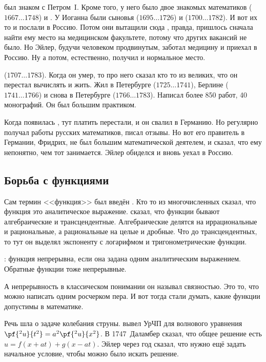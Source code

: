\documentclass[a4paper,oneside,fleqn,10pt]{article}
\newcommand{\pe}[2]{${#1}\ldots{#2}$}
\begin{document}
 был знаком с Петром~I. Кроме того, у него было двое знакомых математиков
 (\pe{1667}{1748}) и .
У Иоганна были сыновья  (\pe{1695}{1726}) и 
(\pe{1700}{1782}). И вот их то и послали в Россию.
Потом они вытащили сюда , правда, пришлось сначала найти ему место на медицинском факультете,
потому что других вакансий не было. Но Эйлер, будучи человеком продвинутым, заботал медицину
и приехал в Россию. Ну а потом, естественно, получил и нормальное место.

 (\pe{1707}{1783}). Когда он умер, то про него сказал кто то из великих, что он перестал вычислять и жить.
Жил в Петербурге (\pe{1725}{1741}), Берлине (\pe{1741}{1766}) и снова в Петербурге (\pe{1766}{1783}).
Написал более 850 работ, 40 монографий. Он был большим практиком.

Когда появилась , тут платить перестали, и он свалил в Германию.
Но регулярно получал работы русских математиков, писал отзывы. Но вот его правитель в Германии, Фридрих,
не был большим математической деятелем, и сказал, что ему непонятно, чем тот занимается.
Эйлер обиделся и вновь уехал в Россию.

\subsection{Борьба с функциями}

Сам термин <<функция>> был введён . Кто то из многочисленных
 сказал, что функция это аналитическое выражение.
 сказал, что функции бывают алгебраические и трансцендентные.
Алгебраические делятся на иррациональные и рациональные, а рациональные на целые и дробные.
Что до трансцендентных, то тут он выделял экспоненту с логарифмом и тригонометрические функции.

: функция непрерывна, если она задана одним аналитическим выражением.
Обратные функции тоже непрерывные.

А непрерывность в классическом понимании он называл связностью. Это то, что можно написать
одним росчерком пера. И вот тогда стали думать, какие функции допустимы в математике.

Речь шла о задаче колебания струны.  вывел УрЧП для волнового уравнения $\pf{^2 u}{t^2} = a^2\pf{^2u}{x^2}$.
В 1747~Даламбер сказал, что общее решение есть $u = f(x+at) + g(x-at)$. Эйлер через год
сказал, что нужно ещё задать начальное условие, чтобы можно было искать решение.
\end{document}
